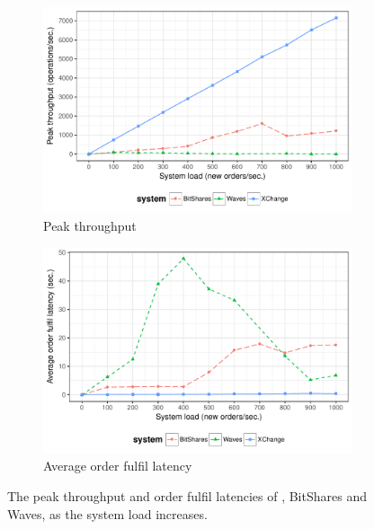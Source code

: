 \begin{figure}[t]
	\centering
	\begin{subfigure}[t]{.5\textwidth}
		\centering
		\captionsetup{width=.9\linewidth}
		\includegraphics[width=.95\linewidth]{xchange/assets/experiments/scalability_comparison}
		\caption{Peak throughput}
		\label{fig:scalability_comparison}
	\end{subfigure}%
	\begin{subfigure}[t]{.5\textwidth}
		\centering
		\captionsetup{width=.9\linewidth}
		\includegraphics[width=.95\linewidth]{xchange/assets/experiments/latency_comparison}
		\caption{Average order fulfil latency}
		\label{fig:latency_comparison}
	\end{subfigure}%
	\caption{The peak throughput and order fulfil latencies of \ModelName{}, BitShares and Waves, as the system load increases.}
	\label{fig:scalability_latency_comparison}
\end{figure}

